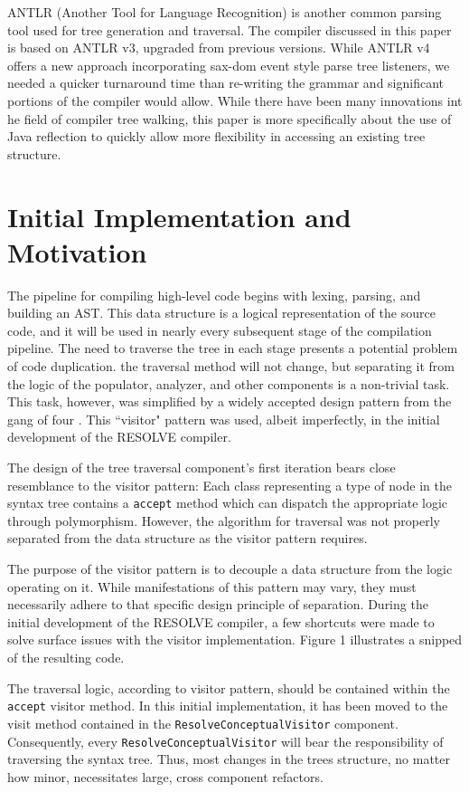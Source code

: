 \documentclass[times]{speauth}
\begin{document}
ANTLR (Another Tool for Language Recognition) is another common parsing tool used for tree generation and traversal. The compiler discussed in this paper is based on ANTLR v3, upgraded from previous versions. While ANTLR v4 offers a new approach incorporating sax-dom event style parse tree listeners, we needed a quicker turnaround time than re-writing the grammar and significant portions of the compiler would allow. While there have been many innovations int he field of compiler tree walking, this paper is more specifically about the use of Java reflection to quickly allow more flexibility in accessing an existing tree structure.

\section{Initial Implementation and Motivation}
The pipeline for compiling high-level code begins with lexing, parsing, and building an AST. This data structure is a logical representation of the source code, and it will be used in nearly every subsequent stage of the compilation pipeline. The need to traverse the tree in each stage presents a potential problem of code duplication. the traversal method will not change, but separating it from the logic of the populator, analyzer, and other components is a non-trivial task. This task, however, was simplified by a widely accepted design pattern from the gang of four \cite{gamma:1995}. This ``visitor" pattern was used, albeit imperfectly, in the initial development of the RESOLVE compiler.

The design of the tree traversal component's first iteration bears close resemblance to the visitor pattern: Each class representing a type of node in the syntax tree contains a \texttt{accept} method which can dispatch the appropriate logic through polymorphism. However, the algorithm for traversal was not properly separated from the data structure as the visitor pattern requires.

The purpose of the visitor pattern is to decouple a data structure from the logic operating on it. While manifestations of this pattern may vary, they must necessarily adhere to that specific design principle of separation. During the initial development of the RESOLVE compiler, a few shortcuts were made to solve surface issues with the visitor implementation. Figure 1 illustrates a snipped of the resulting code.

The traversal logic, according to visitor pattern, should be contained within the \texttt{accept} visitor method. In this initial implementation, it has been moved to the visit method contained in the \texttt{ResolveConceptualVisitor} component. Consequently, every \texttt{ResolveConceptualVisitor} will bear the responsibility of traversing the syntax tree. Thus, most changes in the trees structure, no matter how minor, necessitates large, cross component refactors.
\end{document}
